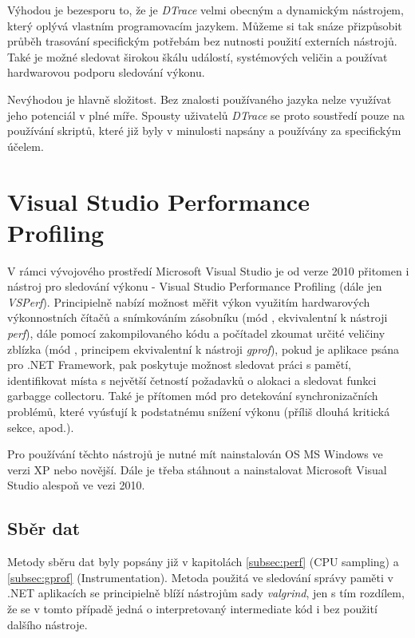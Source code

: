 \documentclass[czech,BP]{thesiskiv}
\begin{document}
Výhodou je bezesporu to, že je \emph{DTrace} velmi obecným a dynamickým nástrojem, který oplývá vlastním programovacím jazykem. Můžeme si tak snáze přizpůsobit průběh trasování specifickým potřebám bez nutnosti použití externích nástrojů. Také je možné sledovat širokou škálu událostí, systémových veličin a používat hardwarovou podporu sledování výkonu.

Nevýhodou je hlavně složitost. Bez znalosti používaného jazyka nelze využívat jeho potenciál v plné míře. Spousty uživatelů \emph{DTrace} se proto soustředí pouze na používání skriptů, které již byly v minulosti napsány a používány za specifickým účelem.




\section{Visual Studio Performance Profiling}

V rámci vývojového prostředí Microsoft Visual Studio je od verze 2010 přitomen i nástroj pro sledování výkonu - Visual Studio Performance Profiling (dále jen \emph{VSPerf}). Principielně nabízí možnost měřit výkon využitím hardwarových výkonnostních čítačů a snímkováním zásobníku (mód , ekvivalentní k nástroji \emph{perf}), dále pomocí zakompilovaného kódu a počítadel zkoumat určité veličiny zblízka (mód , principem ekvivalentní k nástroji \emph{gprof}), pokud je aplikace psána pro .NET Framework, pak poskytuje možnost sledovat práci s pamětí, identifikovat místa s největší četností požadavků o alokaci a sledovat funkci garbagge collectoru. Také je přítomen mód pro detekování synchronizačních problémů, které vyúsťují k podstatnému snížení výkonu (příliš dlouhá kritická sekce, apod.).

Pro používání těchto nástrojů je nutné mít nainstalován OS MS Windows ve verzi XP nebo novější. Dále je třeba stáhnout a nainstalovat Microsoft Visual Studio alespoň ve vezi 2010.

\subsection*{Sběr dat}

Metody sběru dat byly popsány již v kapitolách \ref{subsec:perf} (CPU sampling) a \ref{subsec:gprof} (Instrumentation). Metoda použitá ve sledování správy paměti v .NET aplikacích se principielně blíží nástrojům sady \emph{valgrind}, jen s tím rozdílem, že se v tomto případě jedná o interpretovaný intermediate kód i bez použití dalšího nástroje.
\end{document}
